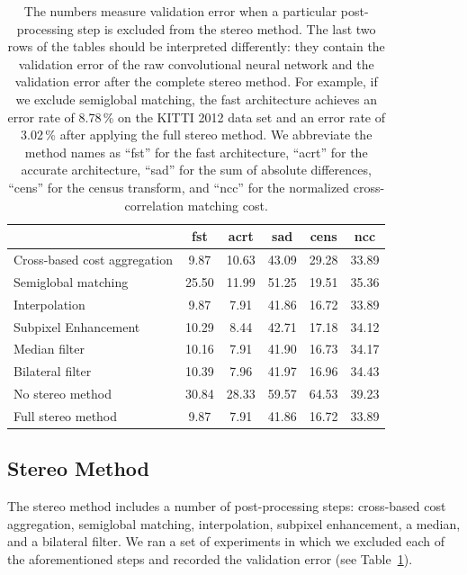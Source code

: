 \documentclass[twoside,11pt]{article}
\begin{document}
\begin{table}[p]
\begin{center}
\begin{tabular}{l ccccc}
\cmidrule(lr){2-6}
& fst & acrt & sad & cens & ncc \\\midrule
Cross-based cost aggregation & 9.87  & 10.63 & 43.09 & 29.28 & 33.89 \\
Semiglobal matching          & 25.50 & 11.99 & 51.25 & 19.51 & 35.36 \\
Interpolation                & 9.87  & 7.91  & 41.86 & 16.72 & 33.89 \\
Subpixel Enhancement         & 10.29 & 8.44  & 42.71 & 17.18 & 34.12 \\
Median filter                & 10.16 & 7.91  & 41.90 & 16.73 & 34.17 \\
Bilateral filter             & 10.39 & 7.96  & 41.97 & 16.96 & 34.43 \\\midrule
No stereo method             & 30.84 & 28.33 & 59.57 & 64.53 & 39.23 \\
Full stereo method           & 9.87  & 7.91  & 41.86 & 16.72 & 33.89 \\\bottomrule
\end{tabular}
\end{center}
\caption{The numbers measure validation error when a particular
post-processing step is excluded from the stereo method.  The last two rows of
the tables should be interpreted differently: they contain the validation error
of the raw convolutional neural network and the validation error after the
complete stereo method.  For example, if we exclude semiglobal matching, the
fast architecture achieves an error rate of 8.78\,\% on the KITTI 2012 data
set and an error rate of 3.02\,\% after applying the full stereo method.
We abbreviate the method names as ``fst'' for the fast architecture, ``acrt''
for the accurate architecture, ``sad'' for the sum of absolute differences,
``cens'' for the census transform, and ``ncc'' for the normalized
cross-correlation matching cost. }

\label{tbl:sm_skip}
\end{table}


\subsection{Stereo Method}

The stereo method includes a number of post-processing steps: cross-based cost
aggregation, semi\-global matching, interpolation, subpixel enhancement, a
median, and a bilateral filter. We ran a set of experiments in which we excluded
each of the aforementioned steps and recorded the validation error (see
Table~\ref{tbl:sm_skip}).
\end{document}
